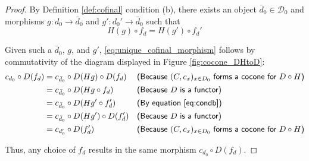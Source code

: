 \documentclass{msthesis}
\theoremstyle{definition}
\newcommand{\mcDo}{\mathcal{D}_0}
\begin{document}
\begin{proof}
    By Definition \ref{def:cofinal} condition (b), there exists an object $\bar{d}_0 \in \mcDo$ and morphisms $g : d_0 \to \bar{d}_0$ and $g' : d_0' \to \bar{d}_0$ such that
    \begin{equation}\label{eq:condb}
        H(g) \circ f_d = H(g') \circ f_d'
    \end{equation}
    
    
    Given such a $\bar{d}_0$, $g$, and $g'$, \eqref{eq:unique_cofinal_morphism} follows by 
    commutativity of the diagram displayed in Figure \ref{fig:cocone_DHtoD}:
\begin{align*}
    c_{d_0} \circ D(f_d) &= c_{\bar{d}_0} \circ D(H g) \circ D(f_d) && \textsf{(Because $(C, c_x)_{x \in D_0}$ forms a cocone for $D \circ H$)} \\
    &= c_{\bar{d}_0} \circ D(H g \circ f_d) && \textsf{(Because $D$ is a functor)} \\
    &= c_{\bar{d}_0} \circ D(H g' \circ f_d') && \textsf{(By equation \eqref{eq:condb})} \\
    &= c_{\bar{d}_0} \circ D(H g') \circ D(f_d') && \textsf{(Because $D$ is a functor)} \\
    &= c_{d_0'} \circ D(f_d') && \textsf{(Because $(C, c_x)_{x \in D_0}$ forms a cocone for $D \circ H$)}
\end{align*}

Thus, any choice of $f_d$ results in the same morphism $c_{d_0} \circ D(f_d)$.
\end{proof}
\end{document}
